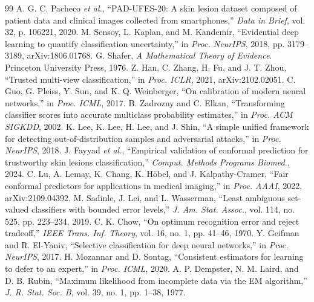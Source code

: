 \documentclass[conference]{IEEEtran}
\begin{document}
\begin{thebibliography}{99}
 A. G. C. Pacheco \textit{et al.}, ``PAD-UFES-20: A skin lesion dataset composed of patient data and clinical images collected from smartphones,'' \textit{Data in Brief}, vol. 32, p. 106221, 2020.
 M. Sensoy, L. Kaplan, and M. Kandemir, ``Evidential deep learning to quantify classification uncertainty,'' in \textit{Proc. NeurIPS}, 2018, pp. 3179--3189, arXiv:1806.01768.
 G. Shafer, \textit{A Mathematical Theory of Evidence}. Princeton University Press, 1976.
 Z. Han, C. Zhang, H. Fu, and J. T. Zhou, ``Trusted multi-view classification,'' in \textit{Proc. ICLR}, 2021, arXiv:2102.02051.
 C. Guo, G. Pleiss, Y. Sun, and K. Q. Weinberger, ``On calibration of modern neural networks,'' in \textit{Proc. ICML}, 2017.
 B. Zadrozny and C. Elkan, ``Transforming classifier scores into accurate multiclass probability estimates,'' in \textit{Proc. ACM SIGKDD}, 2002.
 K. Lee, K. Lee, H. Lee, and J. Shin, ``A simple unified framework for detecting out-of-distribution samples and adversarial attacks,'' in \textit{Proc. NeurIPS}, 2018.
 J. Fayyad \textit{et al.}, ``Empirical validation of conformal prediction for trustworthy skin lesions classification,'' \textit{Comput. Methods Programs Biomed.}, 2024.
 C. Lu, A. Lemay, K. Chang, K. H\"obel, and J. Kalpathy-Cramer, ``Fair conformal predictors for applications in medical imaging,'' in \textit{Proc. AAAI}, 2022, arXiv:2109.04392.
 M. Sadinle, J. Lei, and L. Wasserman, ``Least ambiguous set-valued classifiers with bounded error levels,'' \textit{J. Am. Stat. Assoc.}, vol. 114, no. 525, pp. 223--234, 2019.
 C. K. Chow, ``On optimum recognition error and reject tradeoff,'' \textit{IEEE Trans. Inf. Theory}, vol. 16, no. 1, pp. 41--46, 1970.
 Y. Geifman and R. El-Yaniv, ``Selective classification for deep neural networks,'' in \textit{Proc. NeurIPS}, 2017.
 H. Mozannar and D. Sontag, ``Consistent estimators for learning to defer to an expert,'' in \textit{Proc. ICML}, 2020.
 A. P. Dempster, N. M. Laird, and D. B. Rubin, ``Maximum likelihood from incomplete data via the EM algorithm,'' \textit{J. R. Stat. Soc. B}, vol. 39, no. 1, pp. 1--38, 1977.
\end{thebibliography}
\end{document}
